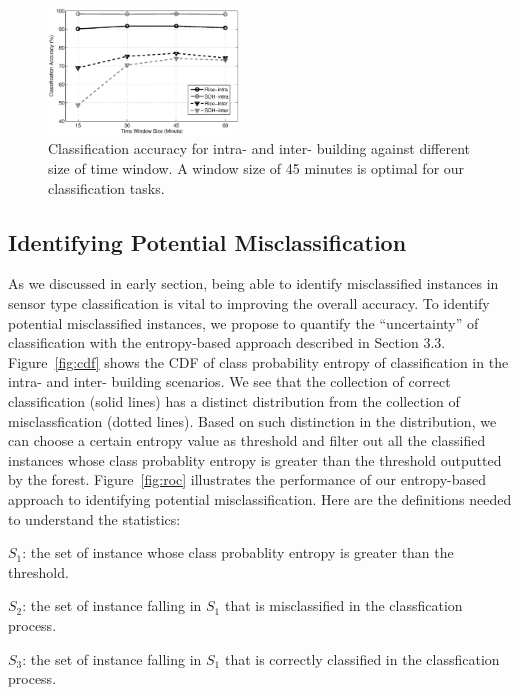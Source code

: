 \begin{figure}[h!]
\centering
	\includegraphics[width=0.45\textwidth]{./fig/window.eps}
\caption{Classification accuracy for intra- and inter- building against different size of time window. A window size of 45 minutes is optimal for our classification tasks.}
\label{fig:window}
\end{figure}

\subsection{Identifying Potential Misclassification}
As we discussed in early section, being able to identify misclassified instances in sensor type classification is vital to improving the overall accuracy. To identify potential misclassified instances, we propose to quantify the ``uncertainty'' of classification with the entropy-based approach described in Section 3.3. Figure~\ref{fig:cdf} shows the CDF of class probability entropy of classification in the intra- and inter- building scenarios. We see that the collection of correct
classification (solid lines) has a distinct distribution from the collection of misclassfication (dotted lines). Based on such distinction in the distribution, we can choose a certain entropy value as threshold and filter out all the classified instances whose class probablity entropy is greater than the threshold outputted by the forest. Figure~\ref{fig:roc} illustrates the performance of our entropy-based approach to identifying potential misclassification. Here are the definitions needed to understand the statistics:

$S_{1}$: the set of instance whose class probablity entropy is greater than the threshold.

$S_{2}$: the set of instance falling in $S_{1}$ that is misclassified in the classfication process.

$S_{3}$: the set of instance falling in $S_{1}$ that is correctly classified in the classfication process.

